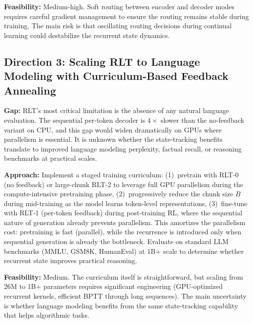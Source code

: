 \documentclass[11pt,a4paper]{article}
\begin{document}
\textbf{Feasibility:} Medium-high. Soft routing between encoder and decoder modes requires careful gradient management to ensure the routing remains stable during training. The main risk is that oscillating routing decisions during continual learning could destabilize the recurrent state dynamics.

\subsection{Direction 3: Scaling RLT to Language Modeling with Curriculum-Based Feedback Annealing}
\textbf{Gap:} RLT's most critical limitation is the absence of any natural language evaluation. The sequential per-token decoder is $4\times$ slower than the no-feedback variant on CPU, and this gap would widen dramatically on GPUs where parallelism is essential. It is unknown whether the state-tracking benefits translate to improved language modeling perplexity, factual recall, or reasoning benchmarks at practical scales.

\textbf{Approach:} Implement a staged training curriculum: (1)~pretrain with RLT-0 (no feedback) or large-chunk RLT-2 to leverage full GPU parallelism during the compute-intensive pretraining phase, (2)~progressively reduce the chunk size $B$ during mid-training as the model learns token-level representations, (3)~fine-tune with RLT-1 (per-token feedback) during post-training RL, where the sequential nature of generation already prevents parallelism. This amortizes the parallelism cost: pretraining is fast (parallel), while the recurrence is introduced only when sequential generation is already the bottleneck. Evaluate on standard LLM benchmarks (MMLU, GSM8K, HumanEval) at 1B+ scale to determine whether recurrent state improves practical reasoning.

\textbf{Feasibility:} Medium. The curriculum itself is straightforward, but scaling from 26M to 1B+ parameters requires significant engineering (GPU-optimized recurrent kernels, efficient BPTT through long sequences). The main uncertainty is whether language modeling benefits from the same state-tracking capability that helps algorithmic tasks.
\end{document}
